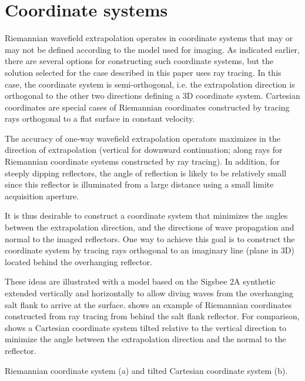 \section{Coordinate systems}
Riemannian wavefield extrapolation operates in coordinate systems that may or may not be defined according to the model used for imaging. As indicated earlier, there are several options for constructing such coordinate systems, but the solution selected for the case described in this paper uses ray tracing. In this case, the coordinate system is semi-orthogonal, i.e. the extrapolation direction is orthogonal to the other two directions defining a 3D coordinate system. Cartesian coordinates are special cases of Riemannian coordinates constructed by tracing rays orthogonal to a flat surface in constant velocity.
\par
The accuracy of one-way wavefield extrapolation operators maximizes in the direction of extrapolation (vertical for downward continuation; along rays for Riemannian coordinate systems constructed by ray tracing). In addition, for steeply dipping reflectors, the angle of reflection is likely to be relatively small since this reflector is illuminated from a large distance using a small limite acquisition aperture. 
\par
It is thus desirable to construct a coordinate system that minimizes the angles between the extrapolation direction, and the directions of wave propagation and normal to the imaged reflectors. One way to achieve this goal is to construct the coordinate system by tracing rays orthogonal to an imaginary line (plane in 3D) located behind the overhanging reflector. 
\par
These ideas are illustrated with a model based on the Sigsbee 2A synthetic \cite[]{SEG-2002-21222125} extended vertically and horizontally to allow diving waves from the overhanging salt flank to arrive at the surface.  shows an example of Riemannian coordinates constructed from ray tracing from behind the salt flank reflector. For comparison,  shows a Cartesian coordinate system tilted relative to the vertical direction to minimize the angle between the extrapolation direction and the normal to the reflector.


{Riemannian coordinate system (a) and 
tilted Cartesian coordinate system (b).}

